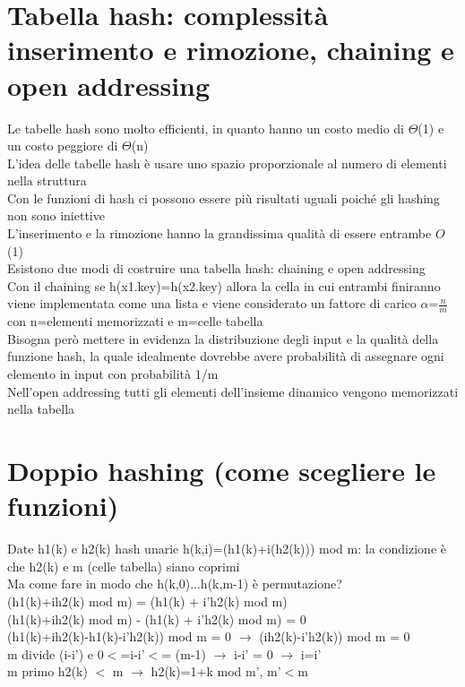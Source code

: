 \documentclass[12pt,oneside,a4paper]{article}
\newcommand\Omicron{O}
\begin{document}
\section{Tabella hash: complessità inserimento e rimozione, chaining e open addressing}
Le tabelle hash sono molto efficienti, in quanto hanno un costo medio di $\Theta$(1) e un costo peggiore di $\Theta$(n)\\
L'idea delle tabelle hash è usare uno spazio proporzionale al numero di elementi nella struttura\\
Con le funzioni di hash ci possono essere più risultati uguali poiché gli hashing non sono iniettive\\
L'inserimento e la rimozione hanno la grandissima qualità di essere entrambe $\Omicron$(1)\\
Esistono due modi di costruire una tabella hash: chaining e open addressing\\
Con il chaining se h(x1.key)=h(x2.key) allora la cella in cui entrambi finiranno viene implementata come una lista e viene considerato un fattore di carico $\alpha$=$\frac{n}{m}$ con n=elementi memorizzati e m=celle tabella\\
Bisogna però mettere in evidenza la distribuzione degli input e la qualità della funzione hash, la quale idealmente dovrebbe avere probabilità di assegnare ogni elemento in input con probabilità 1/m\\
Nell'open addressing tutti gli elementi dell'insieme dinamico vengono memorizzati nella tabella
\section{Doppio hashing (come scegliere le funzioni)}
Date h1(k) e h2(k) hash unarie h(k,i)=(h1(k)+i(h2(k))) mod m: la condizione è che h2(k) e m (celle tabella) siano coprimi \\
Ma come fare in modo che h(k,0)...h(k,m-1) è permutazione?\\
(h1(k)+ih2(k) mod m) = (h1(k) + i'h2(k) mod m)\\
(h1(k)+ih2(k) mod m) - (h1(k) + i'h2(k) mod m) = 0\\
(h1(k)+ih2(k)-h1(k)-i'h2(k)) mod m = 0 $\to$ (ih2(k)-i'h2(k)) mod m = 0\\
m divide (i-i') e 0$<$=i-i'$<$= (m-1) $\to$ i-i' = 0 $\to$ i=i'\\
m primo h2(k) $<$ m $\to$ h2(k)=1+k mod m', m'$<$m
\end{document}
